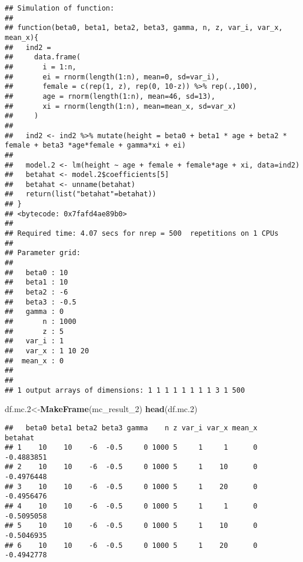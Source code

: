 \documentclass[]{article}
\newenvironment{Shaded}{\begin{snugshade}}{\end{snugshade}}
\newcommand{\DecValTok}[1]{\textcolor[rgb]{0.00,0.00,0.81}{#1}}
\newcommand{\FloatTok}[1]{\textcolor[rgb]{0.00,0.00,0.81}{#1}}
\newcommand{\KeywordTok}[1]{\textcolor[rgb]{0.13,0.29,0.53}{\textbf{#1}}}
\newcommand{\NormalTok}[1]{#1}
\newcommand{\OperatorTok}[1]{\textcolor[rgb]{0.81,0.36,0.00}{\textbf{#1}}}
\begin{document}
\begin{verbatim}
## Simulation of function: 
## 
## function(beta0, beta1, beta2, beta3, gamma, n, z, var_i, var_x, mean_x){
##   ind2 = 
##     data.frame(
##       i = 1:n,
##       ei = rnorm(length(1:n), mean=0, sd=var_i),
##       female = c(rep(1, z), rep(0, 10-z)) %>% rep(.,100),
##       age = rnorm(length(1:n), mean=46, sd=13),
##       xi = rnorm(length(1:n), mean=mean_x, sd=var_x)
##     )
##   
##   ind2 <- ind2 %>% mutate(height = beta0 + beta1 * age + beta2 * female + beta3 *age*female + gamma*xi + ei)
##   
##   model.2 <- lm(height ~ age + female + female*age + xi, data=ind2)
##   betahat <- model.2$coefficients[5]
##   betahat <- unname(betahat)
##   return(list("betahat"=betahat))
## }
## <bytecode: 0x7fafd4ae89b0>
## 
## Required time: 4.07 secs for nrep = 500  repetitions on 1 CPUs 
## 
## Parameter grid: 
## 
##   beta0 : 10 
##   beta1 : 10 
##   beta2 : -6 
##   beta3 : -0.5 
##   gamma : 0 
##       n : 1000 
##       z : 5 
##   var_i : 1 
##   var_x : 1 10 20 
##  mean_x : 0 
## 
##  
## 1 output arrays of dimensions: 1 1 1 1 1 1 1 1 3 1 500
\end{verbatim}

\begin{Shaded}
\begin{Highlighting}[]
\NormalTok{  df.mc}\FloatTok{.2}\NormalTok{<-}\KeywordTok{MakeFrame}\NormalTok{(mc_result_}\DecValTok{2}\NormalTok{)}
  \KeywordTok{head}\NormalTok{(df.mc}\FloatTok{.2}\NormalTok{)}
\end{Highlighting}
\end{Shaded}

\begin{verbatim}
##   beta0 beta1 beta2 beta3 gamma    n z var_i var_x mean_x    betahat
## 1    10    10    -6  -0.5     0 1000 5     1     1      0 -0.4883851
## 2    10    10    -6  -0.5     0 1000 5     1    10      0 -0.4976448
## 3    10    10    -6  -0.5     0 1000 5     1    20      0 -0.4956476
## 4    10    10    -6  -0.5     0 1000 5     1     1      0 -0.5095058
## 5    10    10    -6  -0.5     0 1000 5     1    10      0 -0.5046935
## 6    10    10    -6  -0.5     0 1000 5     1    20      0 -0.4942778
\end{verbatim}

\begin{Shaded}
\end{Shaded}
\end{document}
